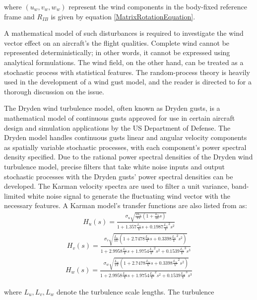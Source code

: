 \documentclass[conference]{IEEEtran}
\begin{document}
\par
where ${(u_w, v_w, w_w)}$ represent the wind components in the body-fixed
reference frame and $R_{IB}$ is given by equation
    {\ref{MatrixRotationEquation}}.
\par
A mathematical model of such disturbances is required to investigate the wind
vector effect on an aircraft's the flight qualities. Complete wind cannot be
represented deterministically; in other words, it cannot be expressed using
analytical formulations. The wind field, on the other hand, can be treated as a
stochastic process with statistical features. The random-process theory is
heavily used in the development of a wind gust model, and the reader is
directed to {\cite{Gust}} for a thorough discussion on the issue.
\par
The Dryden wind turbulence model, often known as Dryden gusts, is a
mathematical model of continuous gusts approved for use in certain aircraft
design and simulation applications by the US Department of Defense.
    {\cite{Field_Path_Following_for_Miniature_Air_vehicles}} The Dryden model
handles continuous gusts linear and angular velocity components as spatially
variable stochastic processes, with each component's power spectral density
specified. Due to the rational power spectral densities of the Dryden wind
turbulence model, precise filters that take white noise inputs and output
stochastic processes with the Dryden gusts' power spectral densities can be
developed. The Karman velocity spectra are used to filter a unit variance,
band-limited white noise signal to generate the fluctuating wind vector with
the necessary features. A Karman model's transfer functions are also listed
from {\cite{Karman}} as:
\begin{align}
    H_u(s)=\frac{\sigma_u\sqrt{\frac{2L_u}{\pi V}(1+\frac{L_u}{4V}s)}}{1+1.357\frac{L_u}{V}s+0.1987{\frac{L_u}{V}}^2s^2}
\end{align}
\begin{align}
    H_v(s)=\frac{\sigma_v\sqrt{\frac{L_v}{\pi V}(1+2.7478\frac{L_u}{V}s+0.3398{\frac{L_v}{V}}^2s^2)}}{1+2.9958\frac{L_v}{V}s+1.9754{\frac{L_v}{V}}^2s^2+0.1539{\frac{L_v}{V}}^3s^3}
\end{align}
\begin{align}
    H_w(s)=\frac{\sigma_w\sqrt{\frac{L_w}{\pi V}(1+2.7478\frac{L_w}{V}s+0.3398{\frac{L_w}{V}}^2s^2)}}{1+2.9958\frac{L_w}{V}s+1.9754{\frac{L_w}{V}}^2s^2+0.1539{\frac{L_w}{V}}^3s^3}
\end{align}
\par
where $L_u, L_v, L_w$ denote the turbulence scale lengths. The turbulence
\end{document}
